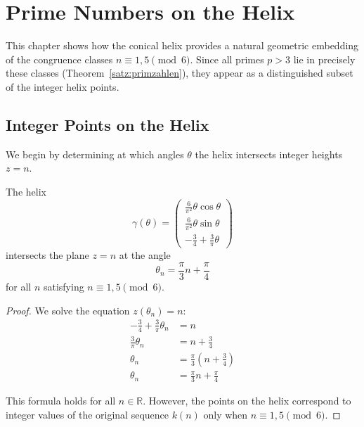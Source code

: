 \chapter{Prime Numbers on the Helix}\label{ch:primes}

This chapter shows how the conical helix provides a natural geometric
embedding of the congruence classes $n \equiv 1,5\pmod{6}$. Since all
primes $p > 3$ lie in precisely these classes
(Theorem~\ref{satz:primzahlen}), they appear as a distinguished subset
of the integer helix points.

\section{Integer Points on the Helix}

We begin by determining at which angles $\theta$ the helix intersects
integer heights $z = n$.

\begin{theorem}\label{thm:integer-points}
The helix
\[
\gamma(\theta) = \begin{pmatrix}
\frac{6}{\pi^2}\theta\cos\theta\\
\frac{6}{\pi^2}\theta\sin\theta\\
-\frac{3}{4} + \frac{3}{\pi}\theta
\end{pmatrix}
\]
intersects the plane $z = n$ at the angle
\begin{equation}\label{eq:theta-n}
\boxed{\theta_n = \frac{\pi}{3}n + \frac{\pi}{4}}
\end{equation}
for all $n$ satisfying $n \equiv 1, 5 \pmod{6}$.
\end{theorem}

\begin{proof}
We solve the equation $z(\theta_n) = n$:
\begin{align}
-\frac{3}{4} + \frac{3}{\pi}\theta_n &= n\\
\frac{3}{\pi}\theta_n &= n + \frac{3}{4}\\
\theta_n &= \frac{\pi}{3}\left(n + \frac{3}{4}\right)\\
\theta_n &= \frac{\pi}{3}n + \frac{\pi}{4}
\end{align}

This formula holds for all $n \in \mathbb{R}$. However, the points on
the helix correspond to integer values of the original sequence $k(n)$
only when $n \equiv 1, 5 \pmod{6}$.
\end{proof}

